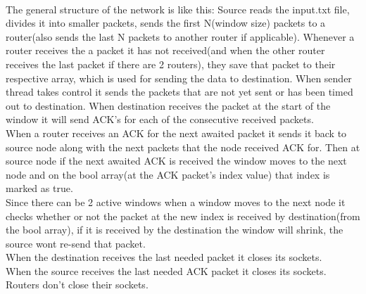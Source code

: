 \documentclass[conference]{IEEEtran}
\begin{document}
\\
The general structure of the network is like this: Source reads the input.txt file, divides it into smaller packets, sends the first N(window size) packets to a router(also sends the last N packets to another router if applicable). Whenever a router receives the a packet it has not received(and when the other router receives the last packet if there are 2 routers), they save that packet to their respective array, which is used for sending the data to destination. When sender thread takes control it sends the packets that are not yet sent or has been timed out to destination. When destination receives the packet at the start of the window it will send ACK's for each of the consecutive received packets. \\ 
When a router receives an ACK for the next awaited packet it sends it back to source node along with the next packets that the node received ACK for. Then at source node if the next awaited ACK is received the window moves to the next node and on the bool array(at the ACK packet's index value) that index is marked as true. \\
Since there can be 2 active windows when a window moves to the next node it checks whether or not the packet at the new index is received by destination(from the bool array), if it is received by the destination the window will shrink, the source wont re-send that packet. \\
When the destination receives the last needed packet it closes its sockets. \\
When the source receives the last needed ACK packet it closes its sockets. \\
Routers don't close their sockets. \\
\end{document}
